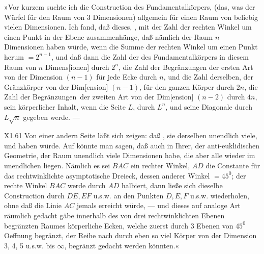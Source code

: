 \indent »Vor kurzem suchte ich die Construction des Fundamentalkörpers, (das, was der Würfel für den Raum von 3 Dimensionen) allgemein für einen Raum von beliebig vielen Dimensionen. Ich fand, daß dieses, , mit der Zahl der rechten Winkel um einen Punkt in der Ebene zusammenhänge, daß nämlich der Raum \(n\) Dimensionen haben würde, wenn die Summe der rechten Winkel um einen Punkt herum \(=2^{n-1}\), und daß dann die Zahl der  des Fundamentalkörpers in diesem Raum von \(n\) Dimens[ionen] durch \(2^n\), die Zahl der Begränzungen der ersten Art von der Dimension \((n-1)\) für jede Ecke durch \(n\), und die Zahl derselben, der Gränzkörper von der Dim[ension] \((n-1)\), für den ganzen Körper durch \(2n\), die Zahl der Begränzungen\begingroup\makeatletter\def\@makefnmark{\hbox{\normalfont\@thefnmark}}\makeatother\renewcommand{\thefootnote}{[**)]}\footnotemark\renewcommand{\thefootnote}{[**)}\footnotetext{In der Handschrift steht \textls[120]{Berührungen}.]}\endgroup\ der zweiten Art von der Dim[ension] \((n-2)\) durch \(4n\), sein körperlicher Inhalt, wenn die Seite \(L\), durch \(L^n\), und seine Diagonale durch \(L\sqrt{n}\) gegeben werde. —
\par\vfill\noindent X1.\hfill61
\clearpage{}
\noindent Von einer andern Seite läßt sich zeigen: daß , sie derselben unendlich viele, und  haben würde. Auf  könnte man sagen, daß auch in Ihrer, der anti-euklidischen Geometrie, der Raum unendlich viele Dimensionen habe, die aber alle wieder im unendlichen liegen. Nämlich es sei \(BAC\) ein rechter Winkel, \(AD\) die Constante für das rechtwinklichte asymptotische Dreieck, dessen anderer Winkel \(=45^0\); der rechte Winkel \(BAC\) werde durch \(AD\) halbiert, dann ließe sich dieselbe Construction durch \(DE,EF\) u.s.w. an den Punkten \(D,E,F\) u.s.w. wiederholen, ohne daß die Linie \(AC\) jemals erreicht würde, — und dieses auf analoge Art räumlich gedacht gäbe innerhalb des von drei rechtwinklichten Ebenen begränzten Raumes körperliche Ecken, welche zuerst durch 3 Ebenen von \(45^0\) Oeffnung begränzt, der Reihe nach durch eben so viel Körper von der Dimension 3, 4, 5 u.s.w. bis \(\infty\), begränzt gedacht werden könnten.«

